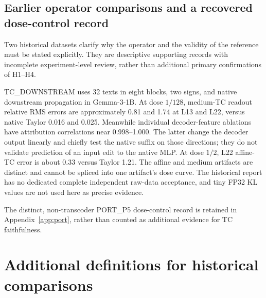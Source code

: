 \subsection{Earlier operator comparisons and a recovered dose-control record}
Two historical datasets clarify why the operator and the validity of the reference must be stated explicitly. They are descriptive supporting records with incomplete experiment-level review, rather than additional primary confirmations of H1--H4.

TC\_DOWNSTREAM uses 32 texts in eight blocks, two signs, and native downstream propagation in Gemma-3-1B. At dose $1/128$, medium-TC readout relative RMS errors are approximately 0.81 and 1.74 at L13 and L22, versus native Taylor 0.016 and 0.025. Meanwhile individual decoder-feature ablations have attribution correlations near 0.998--1.000. The latter change the decoder output linearly and chiefly test the native suffix on those directions; they do not validate prediction of an input edit to the native MLP. At dose $1/2$, L22 affine-TC error is about 0.33 versus Taylor 1.21. The affine and medium artifacts are distinct and cannot be spliced into one artifact's dose curve. The historical report has no dedicated complete independent raw-data acceptance, and tiny FP32 KL values are not used here as precise evidence.

The distinct, non-transcoder PORT\_P5 dose-control record is retained in Appendix~\ref{app:port}, rather than counted as additional evidence for TC faithfulness.


\section{Additional definitions for historical comparisons}

